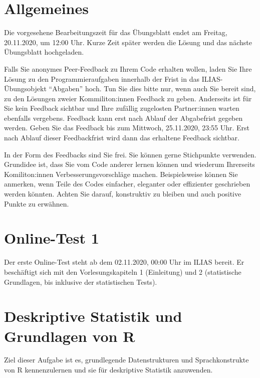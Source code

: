 \documentclass[headinclude,headsepline]{scrartcl}
\begin{document}
\section*{Allgemeines}

Die vorgesehene Bearbeitungszeit für das Übungsblatt endet am Freitag, 20.11.2020, um 12:00 Uhr.
Kurze Zeit später werden die Lösung und das nächste Übungsblatt hochgeladen.

Falls Sie anonymes Peer-Feedback zu Ihrem Code erhalten wollen, laden Sie Ihre Lösung zu den Programmieraufgaben innerhalb der Frist in das ILIAS-Übungsobjekt ``Abgaben'' hoch.
Tun Sie dies bitte nur, wenn auch Sie bereit sind, zu den Lösungen zweier Kommiliton:innen Feedback zu geben.
Anderseits ist für Sie kein Feedback sichtbar und Ihre zufällig zugelosten Partner:innen warten ebenfalls vergebens.
Feedback kann erst nach Ablauf der Abgabefrist gegeben werden.
Geben Sie das Feedback bis zum Mittwoch, 25.11.2020, 23:55 Uhr.
Erst nach Ablauf dieser Feedbackfrist wird dann das erhaltene Feedback sichtbar.

In der Form des Feedbacks sind Sie frei.
Sie können gerne Stichpunkte verwenden.
Grundidee ist, dass Sie vom Code anderer lernen können und wiederum Ihrerseits Komiliton:innen Verbesserungsvorschläge machen.
Beispielsweise können Sie anmerken, wenn Teile des Codes einfacher, eleganter oder effizienter geschrieben werden könnten.
Achten Sie darauf, konstruktiv zu bleiben und auch positive Punkte zu erwähnen.

\section{Online-Test 1}

Der erste Online-Test steht ab dem 02.11.2020, 00:00 Uhr im ILIAS bereit.
Er beschäftigt sich mit den Vorlesungskapiteln 1 (Einleitung) und 2 (statistische Grundlagen, bis inklusive der statistischen Tests).

\section{Deskriptive Statistik und Grundlagen von R}

Ziel dieser Aufgabe ist es, grundlegende Datenstrukturen und Sprachkonstrukte von R kennenzulernen und sie für deskriptive Statistik anzuwenden.

\vspace{10pt}
\end{document}
